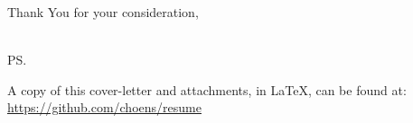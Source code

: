 \documentclass{letter}
\begin{document}
\begin{letter}{}
\closing{Thank You for your consideration,\\
 \\
}

\ps
{}

A copy of this cover-letter and attachments, in \LaTeX, can be found at: \\
\underline{https://github.com/choens/resume}

\end{letter}
\end{document}
